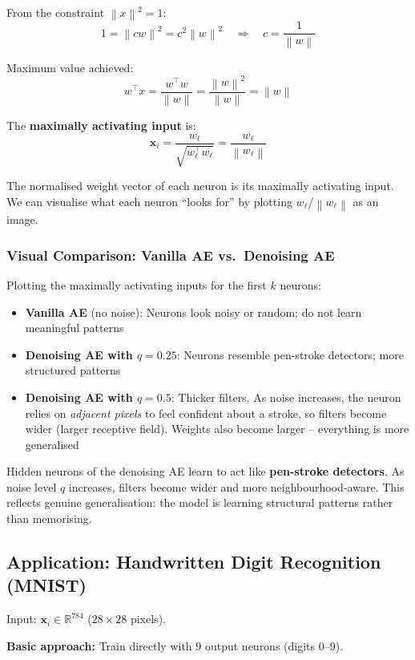 \documentclass[12pt,a4paper]{article}
\newcommand{\R}{\mathbb{R}}
\newcommand{\norm}[1]{\left\|#1\right\|}
\newcommand{\vx}{\mathbf{x}}
\begin{document}
From the constraint $\norm{x}^2 = 1$:
\[
1 = \norm{cw}^2 = c^2\norm{w}^2
\quad\Rightarrow\quad
c = \frac{1}{\norm{w}}
\]

Maximum value achieved:
\[
w^\top x = \frac{w^\top w}{\norm{w}} = \frac{\norm{w}^2}{\norm{w}} = \norm{w}
\]

The \textbf{maximally activating input} is:
\[
\boxed{\vx_i = \frac{w_\ell}{\sqrt{w_\ell^\top w_\ell}} = \frac{w_\ell}{\norm{w_\ell}}}
\]

The normalised weight vector of each neuron is its maximally activating input. We can visualise what each neuron ``looks for'' by plotting $w_\ell/\norm{w_\ell}$ as an image.

\subsubsection{Visual Comparison: Vanilla AE vs.\ Denoising AE}

Plotting the maximally activating inputs for the first $k$ neurons:
\begin{itemize}
  \item \textbf{Vanilla AE} (no noise): Neurons look noisy or random; do not learn meaningful patterns
  \item \textbf{Denoising AE with $q = 0.25$}: Neurons resemble pen-stroke detectors; more structured patterns
  \item \textbf{Denoising AE with $q = 0.5$}: Thicker filters. As noise increases, the neuron relies on \emph{adjacent pixels} to feel confident about a stroke, so filters become wider (larger receptive field). Weights also become larger -- everything is more generalised
\end{itemize}

\begin{keybox}
Hidden neurons of the denoising AE learn to act like \textbf{pen-stroke detectors}. As noise level $q$ increases, filters become wider and more neighbourhood-aware. This reflects genuine generalisation: the model is learning structural patterns rather than memorising.
\end{keybox}

\subsection{Application: Handwritten Digit Recognition (MNIST)}

Input: $\vx_i \in \R^{784}$ ($28\times28$ pixels).

\textbf{Basic approach:} Train directly with 9 output neurons (digits 0--9).
\end{document}
